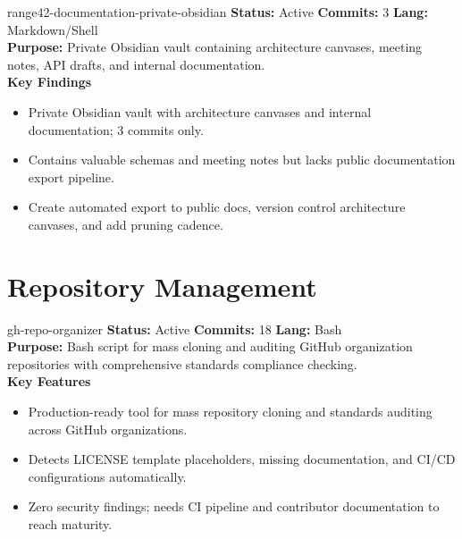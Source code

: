 \documentclass[aspectratio=169]{beamer}
\begin{document}
\begin{frame}{range42-documentation-private-obsidian \; \faBook}
  \textbf{Status:} Active \hfill \textbf{Commits:} 3 \hfill \textbf{Lang:} Markdown/Shell\\[2mm]
  \textbf{Purpose:} Private Obsidian vault containing architecture canvases, meeting notes, API drafts, and internal documentation.\\[2mm]
  \textbf{Key Findings}
  \begin{itemize}
    \item Private Obsidian vault with architecture canvases and internal documentation; 3 commits only.
    \item Contains valuable schemas and meeting notes but lacks public documentation export pipeline.
    \item Create automated export to public docs, version control architecture canvases, and add pruning cadence.
  \end{itemize}
\end{frame}

\section{Repository Management}

\begin{frame}{gh-repo-organizer \; \faDownload}
  \textbf{Status:} Active \hfill \textbf{Commits:} 18 \hfill \textbf{Lang:} Bash\\[2mm]
  \textbf{Purpose:} Bash script for mass cloning and auditing GitHub organization repositories with comprehensive standards compliance checking.\\[2mm]
  \textbf{Key Features}
  \begin{itemize}
    \item Production-ready tool for mass repository cloning and standards auditing across GitHub organizations.
    \item Detects LICENSE template placeholders, missing documentation, and CI/CD configurations automatically.
    \item Zero security findings; needs CI pipeline and contributor documentation to reach maturity.
  \end{itemize}
\end{frame}
\end{document}

